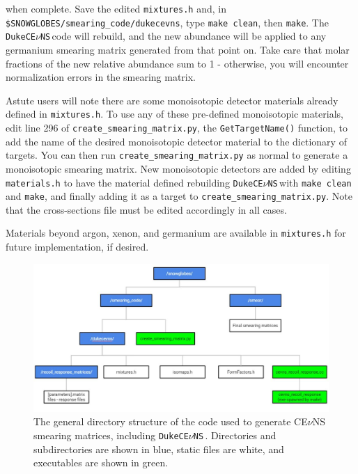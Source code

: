 \documentclass{article}
\newcommand{\cev}{CE$\nu$NS\,}
\newcommand{\dukecev}{\texttt{DukeCE$\nu$NS}\,}
\begin{document}
\noindent when complete. Save the edited \texttt{mixtures.h} and, in \texttt{\$SNOWGLOBES/smearing\_code/dukecevns}, type \texttt{make clean}, then \texttt{make}. The \dukecev code will rebuild, and the new abundance will be applied to any germanium smearing matrix generated from that point on. Take care that molar fractions of the new relative abundance sum to 1 - otherwise, you will encounter normalization errors in the smearing matrix. 

Astute users will note there are some monoisotopic detector materials already defined in \texttt{mixtures.h}. To use any of these pre-defined monoisotopic materials, edit line 296 of \texttt{create\_smearing\_matrix.py}, the \texttt{GetTargetName()} function, to add the name of the desired monoisotopic detector material to the dictionary of targets. You can then run \texttt{create\_smearing\_matrix.py} as normal to generate a monoisotopic smearing matrix. New monoisotopic detectors are added by editing \texttt{materials.h} to have the material defined rebuilding \dukecev with \texttt{make clean} and \texttt{make}, and finally adding it as a target to \texttt{create\_smearing\_matrix.py}. Note that the cross-sections file must be edited accordingly in all cases.

Materials beyond argon, xenon, and germanium are available in \texttt{mixtures.h} for future implementation, if desired.

\begin{figure}[h!]
    \centering
    \includegraphics[width=\textwidth]{figures/CodeStructureDukeCEVNS.JPG}
    \caption{The general directory structure of the code used to generate \cev smearing matrices, including \dukecev. Directories and subdirectories are shown in blue, static files are white, and executables are shown in green.}
    \label{fig:dukecevstructure}
\end{figure}
\end{document}

